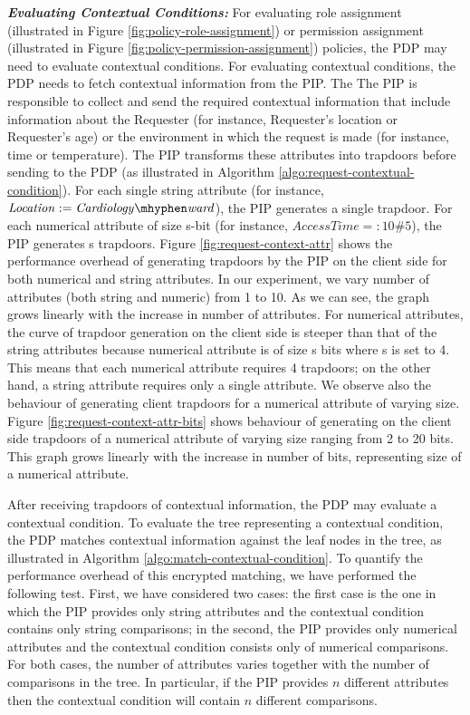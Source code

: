\documentclass[final,5p,times,twocolumn]{elsarticle}
\begin{document}
\emph{\textbf{Evaluating Contextual Conditions:}}
For evaluating role assignment (illustrated in Figure \ref{fig:policy-role-assignment}) or permission assignment (illustrated in Figure \ref{fig:policy-permission-assignment}) policies, the PDP may need to evaluate contextual conditions. For evaluating contextual conditions, the PDP needs to fetch contextual information from the PIP. The The PIP is responsible to collect and send the required contextual information that include information about the Requester (for instance, Requester's location or Requester's age) or the environment in which the request is made (for instance, time or temperature). The PIP transforms these attributes into trapdoors before sending to the PDP (as illustrated in Algorithm \ref{algo:request-contextual-condition}). For each single string attribute (for instance, $\mathit{Location:=Cardiology \mhyphen ward}$), the PIP generates a single trapdoor. For each numerical attribute of size s-bit (for instance, $\mathit{Access Time =: 10\#5}$), the PIP generates s trapdoors. Figure \ref{fig:request-context-attr} shows the performance overhead of generating trapdoors by the PIP on the client side for both numerical and string attributes. In our experiment, we vary number of attributes (both string and numeric) from 1 to 10. As we can see, the graph grows linearly with the increase in number of attributes. For numerical attributes, the curve of trapdoor generation on the client side is steeper than that of the string attributes because numerical attribute is of size s bits where s is set to 4. This means that each numerical attribute requires 4 trapdoors; on the other hand, a string attribute requires only a single attribute. We observe also the behaviour of generating client trapdoors for a numerical attribute of varying size. Figure \ref{fig:request-context-attr-bits} shows behaviour of generating on the client side trapdoors of a numerical attribute of varying size ranging from 2 to 20 bits. This graph grows linearly with the increase in number of bits, representing size of a numerical attribute.

After receiving trapdoors of contextual information, the PDP may evaluate a contextual condition. To evaluate the tree representing a contextual condition, the PDP matches contextual information against the leaf nodes in the tree, as illustrated in Algorithm \ref{algo:match-contextual-condition}. To quantify the performance overhead of this encrypted matching, we have performed the following test. First, we have considered two cases: the first case is the one in which the PIP provides only string attributes and the contextual condition contains only string comparisons; in the second, the PIP provides only numerical attributes and the contextual condition consists only of numerical comparisons. For both cases, the number of attributes varies together with the number of comparisons in the tree. In particular, if the PIP provides $n$ different attributes then the contextual condition will contain $n$ different comparisons.
\end{document}
